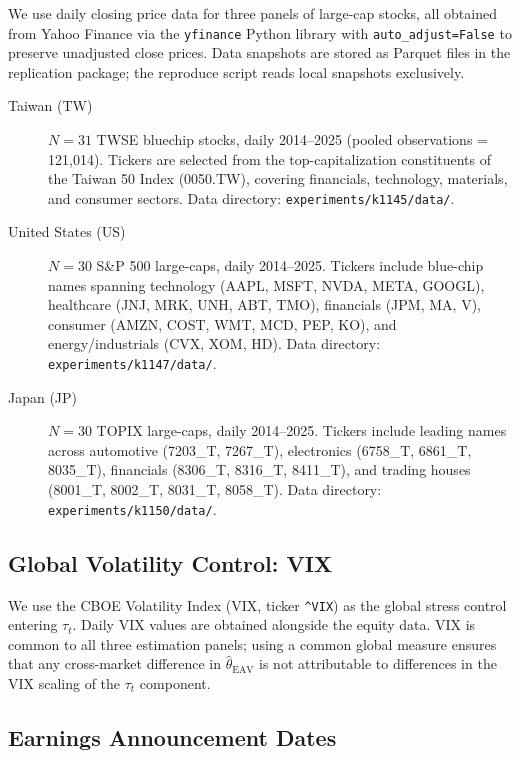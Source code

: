 \documentclass[12pt,a4paper]{article}
\begin{document}
We use daily closing price data for three panels of large-cap stocks, all
obtained from Yahoo Finance via the \texttt{yfinance} Python library with
\texttt{auto\_adjust=False} to preserve unadjusted close prices. Data snapshots
are stored as Parquet files in the replication package; the reproduce script
reads local snapshots exclusively.

\begin{description}
\item[Taiwan (TW)] $N = 31$ TWSE bluechip stocks, daily 2014--2025 (pooled
  observations = 121,014). Tickers are selected from the top-capitalization
  constituents of the Taiwan 50 Index (0050.TW), covering financials,
  technology, materials, and consumer sectors. Data directory:
  \texttt{experiments/k1145/data/}.

\item[United States (US)] $N = 30$ S\&P 500 large-caps, daily 2014--2025.
  Tickers include blue-chip names spanning technology (AAPL, MSFT, NVDA, META,
  GOOGL), healthcare (JNJ, MRK, UNH, ABT, TMO), financials (JPM, MA, V),
  consumer (AMZN, COST, WMT, MCD, PEP, KO), and energy/industrials (CVX, XOM,
  HD). Data directory: \texttt{experiments/k1147/data/}.

\item[Japan (JP)] $N = 30$ TOPIX large-caps, daily 2014--2025. Tickers include
  leading names across automotive (7203\_T, 7267\_T), electronics (6758\_T,
  6861\_T, 8035\_T), financials (8306\_T, 8316\_T, 8411\_T), and trading
  houses (8001\_T, 8002\_T, 8031\_T, 8058\_T). Data directory:
  \texttt{experiments/k1150/data/}.
\end{description}

\subsection{Global Volatility Control: VIX}

We use the CBOE Volatility Index (VIX, ticker \texttt{\^{}VIX}) as the global
stress control entering $\tau_t$. Daily VIX values are obtained alongside the
equity data. VIX is common to all three estimation panels; using a common global
measure ensures that any cross-market difference in $\hat{\theta}_{\mathrm{EAV}}$
is not attributable to differences in the VIX scaling of the $\tau_t$ component.

\subsection{Earnings Announcement Dates}
\end{document}
